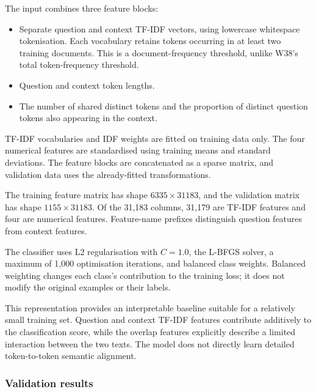 \documentclass[11pt,a4paper]{article}
\begin{document}
The input combines three feature blocks:
\begin{itemize}
    \item Separate question and context TF-IDF vectors, using lowercase
    whitespace tokenisation. Each vocabulary retains tokens occurring
    in at least two training documents. This is a document-frequency
    threshold, unlike W38's total token-frequency threshold.
    \item Question and context token lengths.
    \item The number of shared distinct tokens and the proportion of
    distinct question tokens also appearing in the context.
\end{itemize}

TF-IDF vocabularies and IDF weights are fitted on training data only.
The four numerical features are standardised using training means and
standard deviations. The feature blocks are concatenated as a sparse
matrix, and validation data uses the already-fitted transformations.

The training feature matrix has shape $6335 \times 31183$, and the
validation matrix has shape $1155 \times 31183$. Of the 31,183 columns,
31,179 are TF-IDF features and four are numerical features. Feature-name
prefixes distinguish question features from context features.

The classifier uses L2 regularisation with $C=1.0$, the L-BFGS solver,
a maximum of 1,000 optimisation iterations, and balanced class weights.
Balanced weighting changes each class's contribution to the training
loss; it does not modify the original examples or their labels.

This representation provides an interpretable baseline suitable for a
relatively small training set. Question and context TF-IDF features
contribute additively to the classification score, while the overlap
features explicitly describe a limited interaction between the two
texts. The model does not directly learn detailed token-to-token
semantic alignment.

\subsubsection{Validation results}
\end{document}
